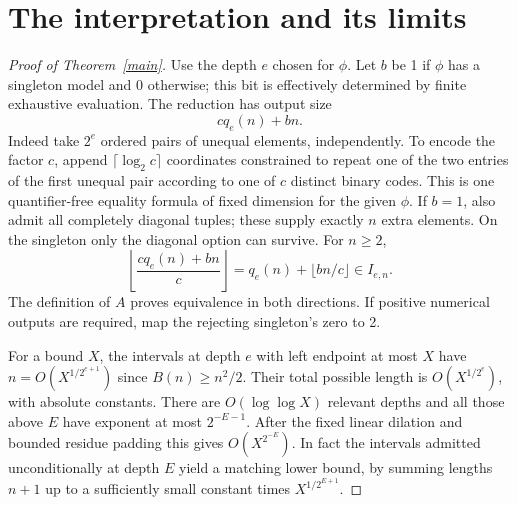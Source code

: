 \documentclass[11pt]{article}
\begin{document}
\section{The interpretation and its limits}
\begin{proof}[Proof of Theorem~\ref{main}]
Use the depth $e$ chosen for $\phi$. Let $b$ be 1 if $\phi$ has a singleton model and 0 otherwise; this bit is effectively determined by finite exhaustive evaluation. The reduction has output size
\[
                         c q_e(n)+bn .
\]
Indeed take $2^e$ ordered pairs of unequal elements, independently. To encode the factor $c$, append $\lceil\log_2 c\rceil$ coordinates constrained to repeat one of the two entries of the first unequal pair according to one of $c$ distinct binary codes. This is one quantifier-free equality formula of fixed dimension for the given $\phi$. If $b=1$, also admit all completely diagonal tuples; these supply exactly $n$ extra elements. On the singleton only the diagonal option can survive. For $n\ge2$,
\[
               \left\lfloor\frac{c q_e(n)+bn}{c}\right\rfloor
                    =q_e(n)+\lfloor bn/c\rfloor\in I_{e,n}.
\]
The definition of $A$ proves equivalence in both directions. If positive numerical outputs are required, map the rejecting singleton's zero to 2.

For a bound $X$, the intervals at depth $e$ with left endpoint at most $X$ have $n=O(X^{1/2^{e+1}})$ since $B(n)\ge n^2/2$. Their total possible length is $O(X^{1/2^e})$, with absolute constants. There are $O(\log\log X)$ relevant depths and all those above $E$ have exponent at most $2^{-E-1}$. After the fixed linear dilation and bounded residue padding this gives $O(X^{2^{-E}})$. In fact the intervals admitted unconditionally at depth $E$ yield a matching lower bound, by summing lengths $n+1$ up to a sufficiently small constant times $X^{1/2^{E+1}}$.
\end{proof}
\end{document}
